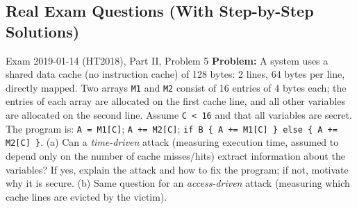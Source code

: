 \documentclass[12pt, a4paper]{article}
\begin{document}
\subsection*{Real Exam Questions (With Step-by-Step Solutions)}

\begin{practicebox}{Exam 2019-01-14 (HT2018), Part II, Problem 5}
\textbf{Problem:} A system uses a shared data cache (no instruction cache) of 128 bytes: 2 lines, 64 bytes per line, directly mapped. Two arrays \texttt{M1} and \texttt{M2} consist of 16 entries of 4 bytes each; the entries of each array are allocated on the first cache line, and all other variables are allocated on the second line. Assume \texttt{C < 16} and that all variables are secret. The program is: \texttt{A = M1[C]}; \texttt{A += M2[C]}; \texttt{if B \{ A += M1[C] \} else \{ A += M2[C] \}}. (a) Can a \emph{time-driven} attack (measuring execution time, assumed to depend only on the number of cache misses/hits) extract information about the variables? If yes, explain the attack and how to fix the program; if not, motivate why it is secure. (b) Same question for an \emph{access-driven} attack (measuring which cache lines are evicted by the victim).


\end{practicebox}
\end{document}
